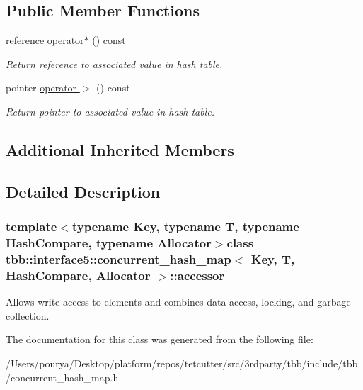 \subsection*{Public Member Functions}
\begin{DoxyCompactItemize}
\item 
\hypertarget{classtbb_1_1interface5_1_1concurrent__hash__map_1_1accessor_a6929aadd30b923bff90b7fee377881ee}{}reference \hyperlink{classtbb_1_1interface5_1_1concurrent__hash__map_1_1accessor_a6929aadd30b923bff90b7fee377881ee}{operator$\ast$} () const \label{classtbb_1_1interface5_1_1concurrent__hash__map_1_1accessor_a6929aadd30b923bff90b7fee377881ee}

\begin{DoxyCompactList}\small\item\em Return reference to associated value in hash table. \end{DoxyCompactList}\item 
\hypertarget{classtbb_1_1interface5_1_1concurrent__hash__map_1_1accessor_aeb06bd15b3434ff85fcebd13c8c47afd}{}pointer \hyperlink{classtbb_1_1interface5_1_1concurrent__hash__map_1_1accessor_aeb06bd15b3434ff85fcebd13c8c47afd}{operator-\/$>$} () const \label{classtbb_1_1interface5_1_1concurrent__hash__map_1_1accessor_aeb06bd15b3434ff85fcebd13c8c47afd}

\begin{DoxyCompactList}\small\item\em Return pointer to associated value in hash table. \end{DoxyCompactList}\end{DoxyCompactItemize}
\subsection*{Additional Inherited Members}


\subsection{Detailed Description}
\subsubsection*{template$<$typename Key, typename T, typename Hash\+Compare, typename Allocator$>$class tbb\+::interface5\+::concurrent\+\_\+hash\+\_\+map$<$ Key, T, Hash\+Compare, Allocator $>$\+::accessor}

Allows write access to elements and combines data access, locking, and garbage collection. 

The documentation for this class was generated from the following file\+:\begin{DoxyCompactItemize}
\item 
/\+Users/pourya/\+Desktop/platform/repos/tetcutter/src/3rdparty/tbb/include/tbb/concurrent\+\_\+hash\+\_\+map.\+h\end{DoxyCompactItemize}

